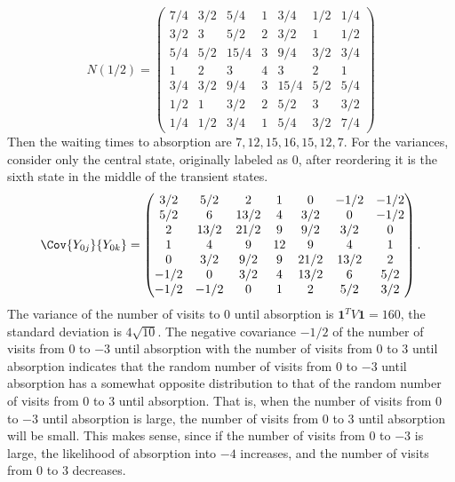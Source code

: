 \documentclass[12pt]{article}
\begin{document}
\begin{example}
    \[
        N(1/2) =
        \begin{pmatrix}
            7/4 & 3/2 & 5/4 & 1 & 3/4 & 1/2 & 1/4\\
            3/2 & 3 & 5/2 & 2 & 3/2 & 1 & 1/2\\
            5/4 & 5/2 & 15/4 & 3 & 9/4 & 3/2 & 3/4\\
            1 & 2 & 3 & 4 & 3 & 2 & 1\\
            3/4 & 3/2 & 9/4 & 3 & 15/4 & 5/2 & 5/4\\
            1/2 & 1 & 3/2 & 2 & 5/2 & 3 & 3/2 \\
            1/4 & 1/2 & 3/4 & 1 & 5/4 & 3/2 & 7/4
        \end{pmatrix}
    \] Then the waiting times to absorption are \( 7, 12, 15, 16, 15,
    12, 7 \).  For the variances, consider only the central state,
    originally labeled as \( 0 \), after reordering it is the sixth
    state in the middle of the transient states.
    \[
        \Cov{Y_{0j}}{ Y_{0k}} =
        \begin{pmatrix}
            3/2 & 5/2 & 2 & 1 & 0 & -1/2 & -1/2 \\
            5/2 & 6 & 13/2 & 4 & 3/2 & 0 & -1/2\\
            2 & 13/2 & 21/2 & 9 & 9/2 & 3/2 & 0\\
            1 & 4 & 9 & 12 & 9 & 4 & 1\\
            0 & 3/2 & 9/2 & 9 & 21/2 & 13/2 & 2\\
            -1/2 & 0 & 3/2 & 4 & 13/2 & 6 & 5/2\\
            -1/2 & -1/2 & 0 & 1 & 2 & 5/2 & 3/2
        \end{pmatrix}
        .
    \] The variance of the number of visits to \( 0 \) until absorption
    is \( \mathbf{1}^{T} V \mathbf{1} = 160 \), the standard deviation
    is \( 4 \sqrt{10} \).  The negative covariance \( -1/2 \) of the
    number of visits from \( 0 \) to \( -3 \) until absorption with the
    number of visits from \( 0 \) to \( 3 \) until absorption indicates
    that the random number of visits from \( 0 \) to \(
    -3 \) until absorption has a somewhat opposite distribution to that of the random
    number of visits  from \( 0 \) to \( 3 \) until absorption.  That is,
    when the number of visits  from \( 0 \) to \( -3 \) until absorption
    is large, the number of visits  from \( 0 \) to \( 3
    \) until absorption will be small.  This makes sense, since if the number of visits
    from \( 0 \) to \( -3 \) is large, the likelihood of absorption into
    \( -4 \) increases, and the number of visits from \( 0 \) to \( 3 \)
    decreases.


\end{example}
\end{document}
